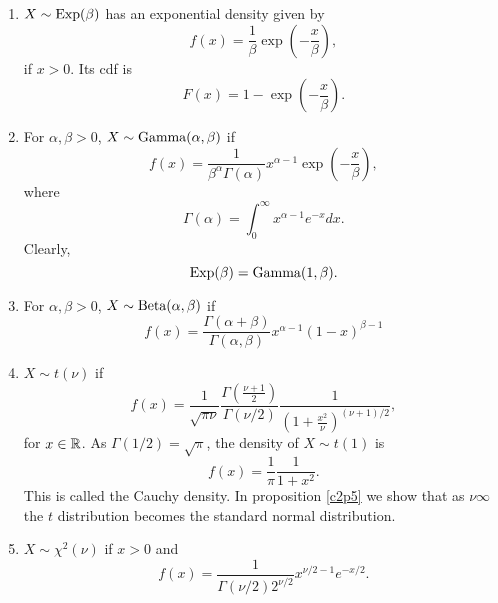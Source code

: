 \documentclass{article}
\begin{document}
\begin{enumerate}
\item $X \sim \text{Exp}(\beta)$ has an exponential density given by
\begin{equation}\label{c2e15}
f(x) = \frac{1}{\beta}\exp\left(-\frac{x}{\beta}\right), 
\end{equation}
if $x > 0$. Its cdf is 
\begin{equation}\label{c2e16}
F(x) = 1 - \exp\left(-\frac{x}{\beta}\right).
\end{equation}

\item For $\alpha, \beta > 0$, $X \sim \text{Gamma}(\alpha, \beta)$ if
\begin{equation}\label{c2e17}
f(x) = \frac{1}{\beta^\alpha\Gamma(\alpha)}x^{\alpha - 1}
\exp\left(-\frac{x}{\beta}\right),
\end{equation}
where
\begin{equation}\label{c2e18}
\Gamma(\alpha) = \int_0^\infty x^{\alpha - 1}e^{-x}dx.
\end{equation}
Clearly,
\begin{equation}\label{c2e19}
\text{Exp}(\beta) = \text{Gamma}(1, \beta).
\end{equation}

\item For $\alpha, \beta > 0$, $X \sim \text{Beta}(\alpha, \beta)$ if
\begin{equation}\label{c2e20}
f(x) = \frac{\Gamma(\alpha + \beta)}{\Gamma(\alpha, \beta)}
       x^{\alpha - 1}(1 - x)^{\beta - 1}
\end{equation}

\item $X \sim t(\nu)$ if
\begin{equation}\label{c2e21}
f(x) = \frac{1}{\sqrt{\pi\nu}}\frac{\Gamma(\frac{\nu+1}{2})}{\Gamma(\nu/2)}
	   \frac{1}{\left(1 + \frac{x^2}{\nu}\right)^{(\nu+1)/2}},
\end{equation}
for $x \in \mathbb{R}$. As $\Gamma(1/2) = \sqrt{\pi}$, the density of $X \sim t(1)$ is
\begin{equation}\label{c2e22}
f(x) = \frac{1}{\pi}\frac{1}{1 + x^2}.
\end{equation}
This is called the Cauchy density. In proposition \ref{c2p5} we show that as 
$\nu \infty$ the $t$ distribution becomes the standard normal distribution.

\item $X \sim \chi^2(\nu)$ if $x > 0$ and
\begin{equation}\label{c2e23}
f(x) = \frac{1}{\Gamma(\nu/2) 2^{\nu/2}}x^{\nu/2 - 1}e^{-x/2}.
\end{equation}
\end{enumerate}
\end{document}
